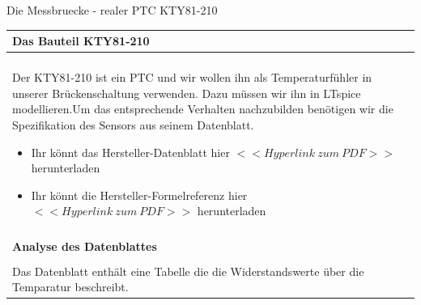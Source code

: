\begin{frame}[t]{Die Messbruecke - realer PTC KTY81-210}

    \begin{spacing}{0.9} \begin{tiny}
            \begin{table}[h!]
                \begin{tabular}{p{10cm}}
                    \hline
                    \textbf{Das Bauteil KTY81-210}    \\
                    \hline                            \\
                    \begin{minipage}{\textwidth}
                        Der KTY81-210 ist ein PTC und wir wollen ihn als Temperaturfühler in unserer Brückenschaltung verwenden.\newline
                        Dazu müssen wir ihn in LTspice modellieren.\newline\newline Um das entsprechende Verhalten nachzubilden benötigen wir die
                        Spezifikation des Sensors aus seinem Datenblatt.
                        \begin{itemize}
                            \item Ihr könnt das Hersteller-Datenblatt hier \href{https://cdn-reichelt.de/documents/datenblatt/B400/KTY81-2\%23PHI.pdf}{ $ << Hyperlink\ zum\ PDF >> $} herunterladen
                            \item Ihr könnt die Hersteller-Formelreferenz hier \href{https://www.mikrocontroller.net/attachment/243481/KTY-Philips.pdf}{$ << Hyperlink\ zum\ PDF >> $} herunterladen
                        \end{itemize}


                    \end{minipage}
                    \\ \\
                    \hline
                    \textbf{Analyse des Datenblattes} \\
                    \hline                            \\
                    \begin{minipage}{\textwidth}
                        Das Datenblatt enthält eine Tabelle die die Widerstandswerte über die Temparatur beschreibt. \newline


\end{minipage}
\end{tabular}
\end{table}
\end{tiny}
\end{spacing}
\end{frame}
